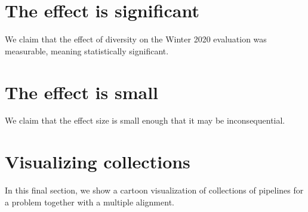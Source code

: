 \documentclass{article}
\begin{document}
\section{The effect is significant}
\label{sec:significant}
We claim that the effect of diversity on the Winter 2020 evaluation
was measurable, meaning statistically significant.

\section{The effect is small}
\label{sec:small}
We claim that the effect size is small enough that it may be
inconsequential.

\section{Visualizing collections}
\label{sec:visualization}
In this final section, we show a cartoon visualization of collections
of pipelines for a problem together with a multiple alignment.
\end{document}
